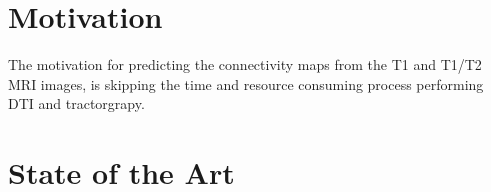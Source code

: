 \section{Motivation}

The motivation for predicting the connectivity maps from the T1 and T1/T2 \ac{MRI} images, is skipping the time and resource consuming process performing \ac{DTI} and tractorgrapy.

\section{State of the Art}





























